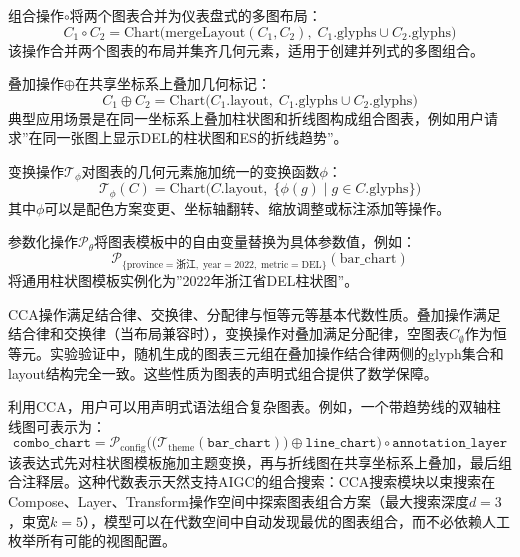 组合操作$\circ$将两个图表合并为仪表盘式的多图布局：
\begin{equation}
    C_1 \circ C_2 = \text{Chart}\big(\text{mergeLayout}(C_1, C_2),\; C_1.\text{glyphs} \cup C_2.\text{glyphs}\big)
\end{equation}
该操作合并两个图表的布局并集齐几何元素，适用于创建并列式的多图组合。

叠加操作$\oplus$在共享坐标系上叠加几何标记：
\begin{equation}
    C_1 \oplus C_2 = \text{Chart}\big(C_1.\text{layout},\; C_1.\text{glyphs} \cup C_2.\text{glyphs}\big)
\end{equation}
典型应用场景是在同一坐标系上叠加柱状图和折线图构成组合图表，例如用户请求”在同一张图上显示DEL的柱状图和ES的折线趋势”。

变换操作$\mathcal{T}_\phi$对图表的几何元素施加统一的变换函数$\phi$：
\begin{equation}
    \mathcal{T}_\phi(C) = \text{Chart}\big(C.\text{layout},\; \{ \phi(g) \mid g \in C.\text{glyphs} \}\big)
\end{equation}
其中$\phi$可以是配色方案变更、坐标轴翻转、缩放调整或标注添加等操作。

参数化操作$\mathcal{P}_\theta$将图表模板中的自由变量替换为具体参数值，例如：
\begin{equation*}
    \mathcal{P}_{\{\text{province}=\text{浙江},\; \text{year}=2022,\; \text{metric}=\text{DEL}\}}(\text{bar\_chart})
\end{equation*}
将通用柱状图模板实例化为”2022年浙江省DEL柱状图”。

CCA操作满足结合律、交换律、分配律与恒等元等基本代数性质。叠加操作满足结合律和交换律（当布局兼容时），变换操作对叠加满足分配律，空图表$C_\emptyset$作为恒等元。实验验证中，随机生成的图表三元组在叠加操作结合律两侧的glyph集合和layout结构完全一致。这些性质为图表的声明式组合提供了数学保障。

利用CCA，用户可以用声明式语法组合复杂图表。例如，一个带趋势线的双轴柱线图可表示为：
\begin{equation*}
    \texttt{combo\_chart} =
    \mathcal{P}_{\text{config}}\Big(
        \big(\mathcal{T}_{\text{theme}}(\texttt{bar\_chart})\big) \oplus \texttt{line\_chart}
    \Big) \circ \texttt{annotation\_layer}
\end{equation*}
该表达式先对柱状图模板施加主题变换，再与折线图在共享坐标系上叠加，最后组合注释层。这种代数表示天然支持AIGC的组合搜索：CCA搜索模块以束搜索在Compose、Layer、Transform操作空间中探索图表组合方案（最大搜索深度$d=3$，束宽$k=5$），模型可以在代数空间中自动发现最优的图表组合，而不必依赖人工枚举所有可能的视图配置。

